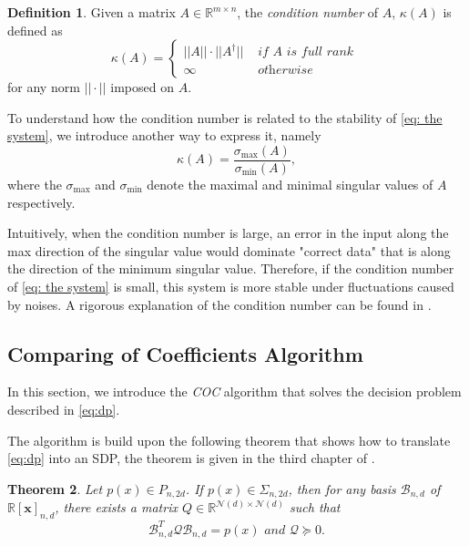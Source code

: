 \documentclass[12pt]{amsart}
\numberwithin{equation}{section}
\newtheorem{thm}{Theorem}
\theoremstyle{definition}
\newtheorem{definition}[thm]{Definition}
\numberwithin{thm}{section}
\begin{document}
\begin{definition}
     \label{def:COND}
     Given a matrix $A \in \mathbb{R}^{m \times n}$, the \emph{condition number} of $A$, $\kappa(A)$ is defined as
     \begin{equation*}
          \kappa(A) = \begin{cases}
                ||A|| \cdot ||A^\dagger|| & \textit{ if } A \textit{ is full rank } \\
                \infty & \textit{ otherwise }
          \end{cases}
     \end{equation*}
     for any norm $|| \cdot ||$ imposed on $A$.
\end{definition}

To understand how the condition number is related to the stability of \eqref{eq: the system}, we introduce another way to express it, namely
\begin{equation*}
     \kappa(A) = \frac{\sigma_{\max} (A)}{\sigma_{\min} (A)},
\end{equation*}
where the $\sigma_{\max}$ and $\sigma_{\min}$ denote the maximal and minimal singular values of $A$ respectively.

Intuitively, when the condition number is large, an error in the input along the max direction of the singular value 
would dominate "correct data" that is along the direction of the minimum singular value. 
Therefore, if the condition number of \eqref{eq: the system} is small, this system is more stable under fluctuations caused by noises.
A rigorous explanation of the condition number can be found in \cite{Cheney:Kincaid}.

\subsection{Comparing of Coefficients Algorithm}
In this section, we introduce the \emph{COC} algorithm that solves the 
decision problem described in \eqref{eq:dp}.

The algorithm is build upon the following theorem that shows how to translate \eqref{eq:dp} into an SDP, the theorem is given in the third chapter of \cite{Blekherman:Parrilo:Thomas}.
\begin{thm}
     \label{thm:key}
     Let $p(x) \in P_{n, 2d}$. If $p(x) \in \Sigma_{n, 2d}$, then for any basis $\mathcal{B}_{n, d}$ of $\mathbb{R}[\mathbf{x}]_{n, d}$, 
     there exists a matrix $Q \in \mathbb{R}^{\mathcal{N}(d) \times \mathcal{N}(d)}$ such that
     \begin{equation}
          \mathcal{B}_{n, d} ^ T \mathcal{Q} \mathcal{B}_{n, d} = p(x) \textit{ and } \mathcal{Q} \succcurlyeq 0 \label{eq:2-4}.
     \end{equation}
\end{thm}
\end{document}
